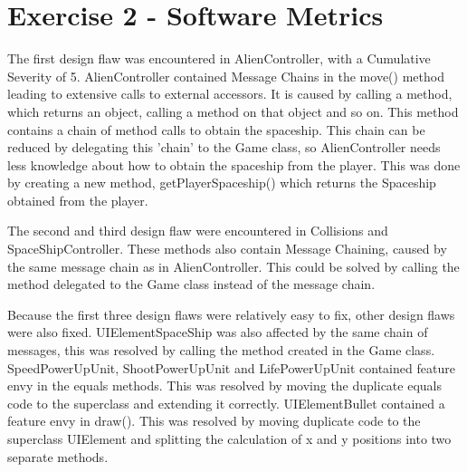 
\section{Exercise 2 - Software Metrics }

The first design flaw was encountered in AlienController, with a Cumulative Severity of 5. 
AlienController contained Message Chains in the move() method leading to extensive calls to external accessors. It is caused by calling a method, which returns an object, calling a method on that object and so on. This method contains a chain of method calls to obtain the spaceship. This chain can be reduced by delegating this 'chain' to the Game class, so AlienController needs less knowledge about how to obtain the spaceship from the player. This was done by creating a new method, getPlayerSpaceship() which returns the Spaceship obtained from the player.

The second and third design flaw were encountered in Collisions and SpaceShipController. These methods also contain Message Chaining, caused by the same message chain as in AlienController. This could be solved by calling the method delegated to the Game class instead of the message chain.

Because the first three design flaws were relatively easy to fix, other design flaws were also fixed. 
UIElementSpaceShip was also affected by the same chain of messages, this was resolved by calling the method created in the Game class. SpeedPowerUpUnit, ShootPowerUpUnit and LifePowerUpUnit contained feature envy in the equals methods. This was resolved by moving the duplicate equals code to the superclass and extending it correctly. UIElementBullet contained a feature envy in draw(). This was resolved by moving duplicate code to the superclass UIElement and splitting the calculation of x and y positions into two separate methods. 
